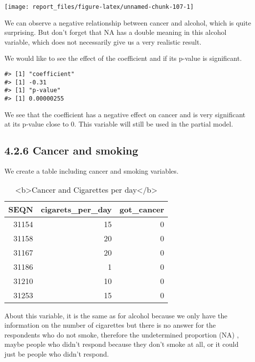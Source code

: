 \documentclass[
]{article}
\begin{document}
\begin{center}\texttt{[image: report\_files/figure-latex/unnamed-chunk-107-1]} \end{center}

We can observe a negative relationship between cancer and alcohol, which
is quite surprising. But don't forget that NA has a double meaning in
this alcohol variable, which does not necessarily give us a very
realistic result.

We would like to see the effect of the coefficient and if its p-value is
significant.

\begin{verbatim}
#> [1] "coefficient"
#> [1] -0.31
#> [1] "p-value"
#> [1] 0.00000255
\end{verbatim}

We see that the coefficient has a negative effect on cancer and is very
significant at its p-value close to 0. This variable will still be used
in the partial model.

\hypertarget{cancer-and-smoking}{%
\subsection{4.2.6 Cancer and smoking}\label{cancer-and-smoking}}

We create a table including cancer and smoking variables.

\begin{table}

\caption{\label{tab:unnamed-chunk-109}<b>Cancer and Cigarettes per day</b>}
\centering
\begin{tabular}[t]{r|r|r}
\hline
SEQN & cigarets\_per\_day & got\_cancer\\
\hline
31154 & 15 & 0\\
\hline
31158 & 20 & 0\\
\hline
31167 & 20 & 0\\
\hline
31186 & 1 & 0\\
\hline
31210 & 10 & 0\\
\hline
31253 & 15 & 0\\
\hline
\end{tabular}
\end{table}

About this variable, it is the same as for alcohol because we only have
the information on the number of cigarettes but there is no answer for
the respondents who do not smoke, therefore the undetermined proportion
(NA) , maybe people who didn't respond because they don't smoke at all,
or it could just be people who didn't respond.
\end{document}
